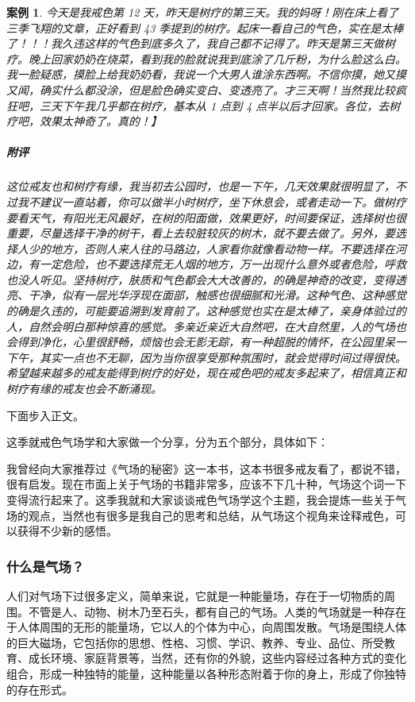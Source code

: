 \documentclass{ctexart}
\newtheorem{case}{案例}
\begin{document}
\begin{case}
    今天是我戒色第 12 天，昨天是树疗的第三天。我的妈呀！刚在床上看了三季飞翔的文章，正好看到 43 季提到的树疗。起床一看自己的气色，实在是太棒了！！！我久违这样的气色到底多久了，我自己都不记得了。昨天是第三天做树疗。晚上回家奶奶在烧菜，看到我的脸就说我到底涂了几斤粉，为什么脸这么白。我一脸疑惑，摸脸上给我奶奶看，我说一个大男人谁涂东西啊。不信你摸，她又摸又闻，确实什么都没涂，但是脸色确实变白、变透亮了。才三天啊！当然我比较疯狂吧，三天下午我几乎都在树疗，基本从 1 点到 4 点半以后才回家。各位，去树疗吧，效果太神奇了。真的！】
    \subparagraph{附评} 这位戒友也和树疗有缘，我当初去公园时，也是一下午，几天效果就很明显了，不过我不建议一直站着，你可以做半小时树疗，坐下休息会，或者走动一下。做树疗要看天气，有阳光无风最好，在树的阳面做，效果更好，时间要保证，选择树也很重要，尽量选择干净的树干，看上去较脏较灰的树木，就不要去做了。另外，要选择人少的地方，否则人来人往的马路边，人家看你就像看动物一样。不要选择在河边，有一定危险，也不要选择荒无人烟的地方，万一出现什么意外或者危险，呼救也没人听见。坚持树疗，肤质和气色都会大大改善的，的确是神奇的改变，变得透亮、干净，似有一层光华浮现在面部，触感也很细腻和光滑。这种气色、这种感觉的确是久违的，可能要追溯到发育前了。这种感觉也实在是太棒了，亲身体验过的人，自然会明白那种惊喜的感觉。多亲近亲近大自然吧，在大自然里，人的气场也会得到净化，心里很舒畅，烦恼也会无影无踪，有一种超脱的情怀，在公园里呆一下午，其实一点也不无聊，因为当你很享受那种氛围时，就会觉得时间过得很快。希望越来越多的戒友能得到树疗的好处，现在戒色吧的戒友多起来了，相信真正和树疗有缘的戒友也会不断涌现。
\end{case}

下面步入正文。

这季就戒色气场学和大家做一个分享，分为五个部分，具体如下：

我曾经向大家推荐过《气场的秘密》这一本书，这本书很多戒友看了，都说不错，很有启发。现在市面上关于气场的书籍非常多，应该不下几十种，气场这个词一下变得流行起来了。这季我就和大家谈谈戒色气场学这个主题，我会提炼一些关于气场的观点，当然也有很多是我自己的思考和总结，从气场这个视角来诠释戒色，可以获得不少新的感悟。

\subsubsection{什么是气场？}

人们对气场下过很多定义，简单来说，它就是一种能量场，存在于一切物质的周围。不管是人、动物、树木乃至石头，都有自己的气场。人类的气场就是一种存在于人体周围的无形的能量场，它以人的个体为中心，向周围发散。气场是围绕人体的巨大磁场，它包括你的思想、性格、习惯、学识、教养、专业、品位、所受教育、成长环境、家庭背景等，当然，还有你的外貌，这些内容经过各种方式的变化组合，形成一种独特的能量，这种能量以各种形态附着于你的身上，形成了你独特的存在形式。
\end{document}
